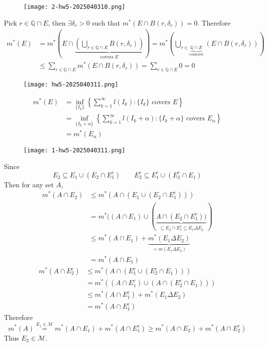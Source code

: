 \begin{figure}[H]
\centering
\texttt{[image: 2-hw5-2025040310.png]}
\label{}
\end{figure}
Pick $r\in \mathbb{Q}\cap E$, then $\exists\delta_{r}>0$ such that $m^{*}(E\cap B(r,\delta_{r}))=0$. Therefore
\[
\begin{aligned}
m^{*}(E) & =m^{*}\left( E\cap\underbrace{ \left( \bigcup_{r\in \mathbb{Q}\cap E}B(r,\delta_{r}) \right) }_{ \text{covers }E } \right)=m^{*}\left( \bigcup_{r\in \underbrace{ \mathbb{Q}\cap E }_{ \text{countable} }}(E\cap B(r,\delta_{r})) \right) \\
 & \leq \sum_{r\in \mathbb{Q}\cap E}m^{*}(E\cap B(r,\delta_{r}))=\sum_{r\in \mathbb{Q}\cap E}0=0
\end{aligned}
\]
\begin{figure}[H]
\centering
\texttt{[image: hw5-2025040311.png]}
\label{}
\end{figure}
\[
\begin{aligned}
m^{*}(E) & =\inf_{\{ I_k \}}\left\{  \sum_{k=1}^{\infty} l(I_k):\{ I_k \}\text{ covers }E  \right\} \\
 & =\inf_{\{ I_k+\alpha \} }\left\{  \sum_{k=1}^{\infty} l(I_k+\alpha): \{ I_k+\alpha \}\text{ covers }E_{\alpha}  \right\} \\
 & =m^{*}(E_{\alpha})
\end{aligned}
\]
\begin{figure}[H]
\centering
\texttt{[image: 1-hw5-2025040311.png]}
\label{}
\end{figure}

Since
\[
E_2\subseteq E_1\cup(E_2\cap E_1^{c})\qquad E_2^{c}\subseteq E_1^{c}\cup(E_2^{c}\cap E_1)
\]
Then for any set $A$,
\[
\begin{aligned}
m^{*}(A\cap E_2) & \leq m^{*}(A\cap(E_1\cup(E_2\cap E_1^{c}))) \\
 & =m^{*}((A\cap E_1)\cup(\underbrace{ A\cap(E_2\cap E_1^{c})) }_{ \subseteq E_2\cap E_1^{c}\subseteq E_1\Delta E_2 }) \\
 & \leq m^{*}(A\cap E_1)+\underbrace{ m^{*}(E_1\Delta E_2) }_{ =m(E_1\Delta E_2) } \\
 & =m^{*}(A\cap E_1)
\end{aligned}
\]
\[
\begin{aligned}
m^{*}(A\cap E_2^{c}) & \leq m^{*}(A\cap(E_1^{c}\cup(E_2^{c}\cap E_1))) \\
 & =m^{*}((A\cap E_1^{c})\cup(A\cap(E_2^{c}\cap E_1))) \\
 & \leq m^{*}(A\cap E_1^{c})+m^{*}(E_1\Delta E_2) \\
 & = m^{*}(A\cap E_1^{c})
\end{aligned}
\]
Therefore
\[
m^{*}(A)\overset{ E_1\in \mathcal{M} }{ = }m^{*}(A\cap E_1)+m^{*}(A\cap E_1^{c})\geq m^{*}(A\cap E_2)+m^{*}(A\cap E_2^{c})
\]
Thus $E_2\in \mathcal{M}$.

